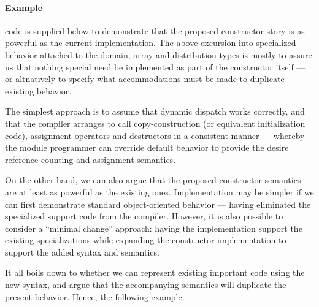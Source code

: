 \paragraph{Example}
code is supplied below to demonstrate that the proposed constructor story is as
powerful as the current implementation.  The above excursion into specialized
behavior attached to the domain, array and distribution types is mostly to
assure us that nothing special need be implemented as part of the constructor
itself --- or altnatively to specify what accommodations must be made to
duplicate existing behavior.  

The simplest approach is to assume that dynamic dispatch works correctly, and
that the compiler arranges to call copy-construction (or equivalent
initialization code), assignment operators and destructors in a consistent
manner --- whereby the module programmer can override default behavior to
provide the desire reference-counting and assignment semantics.

On the other hand, we can also argue that the proposed constructor semantics are
at least as powerful as the existing ones.  Implementation may be simpler if we
can first demonstrate standard object-oriented behavior --- having eliminated
the specialized support code from the compiler.  However, it is also possible to
consider a ``minimal change'' approach: having the implementation support the
existing specializations while expanding the constructor implementation to
support the added syntax and semantics.

It all boils down to whether we can represent existing important code using the
new syntax, and argue that the accompanying semantics will duplicate the present
behavior.  Hence, the following example.

